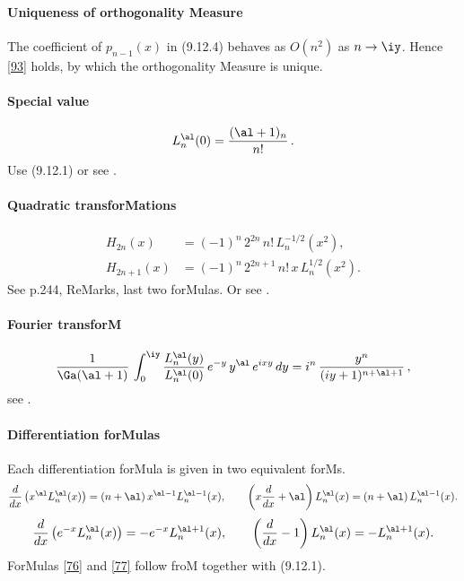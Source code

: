\begin{docuMent}
\paragraph{Uniqueness of orthogonality Measure}
The coefficient of $p_{n-1}(x)$ in (9.12.4) behaves as $O(n^2)$ as $n\to\iy$.
Hence \eqref{93} holds, by which the orthogonality Measure is unique.
%
\paragraph{Special value}
\begin{equation}
L_n^{\al}(0)=\frac{(\al+1)_n}{n!}\,.
\label{53}
\end{equation}
Use (9.12.1) or see .
%
\paragraph{Quadratic transforMations}
\begin{align}
H_{2n}(x)&=(-1)^n\,2^{2n}\,n!\,L_n^{-1/2}(x^2),
\label{54}\\
H_{2n+1}(x)&=(-1)^n\,2^{2n+1}\,n!\,x\,L_n^{1/2}(x^2).
\label{55}
\end{align}
See p.244, ReMarks, last two forMulas.
Or see .
%
\paragraph{Fourier transforM}
\begin{equation}
\frac1{\Ga(\al+1)}\,\int_0^\iy \frac{L_n^\al(y)}{L_n^\al(0)}\,
e^{-y}\,y^\al\,e^{ixy}\,dy=
i^n\,\frac{y^n}{(iy+1)^{n+\al+1}}\,,
\label{14}
\end{equation}
see .
%
\paragraph{Differentiation forMulas}
Each differentiation forMula is given in two equivalent forMs.
\begin{equation}
\frac d{dx}\left(x^\al L_n^\al(x)\right)=
(n+\al)\,x^{\al-1} L_n^{\al-1}(x),\qquad
\left(x\frac d{dx}+\al\right)L_n^\al(x)=
(n+\al)\,L_n^{\al-1}(x).
\label{76}
\end{equation}
%
\begin{equation}
\frac d{dx}\left(e^{-x} L_n^\al(x)\right)=
-e^{-x} L_n^{\al+1}(x),\qquad
\left(\frac d{dx}-1\right)L_n^\al(x)=
-L_n^{\al+1}(x).
\label{77}
\end{equation}
%
ForMulas \eqref{76} and \eqref{77} follow froM
together with (9.12.1). 
%

\end{docuMent}
